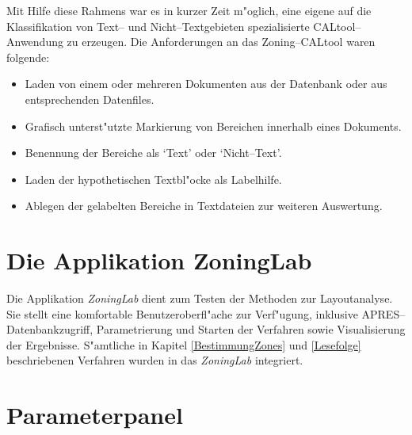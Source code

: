 Mit Hilfe diese Rahmens war es in kurzer Zeit m"oglich, eine eigene
auf die Klassifikation von Text-- und
Nicht--Textgebieten spezialisierte CALtool--Anwendung zu erzeugen. Die Anforderungen an das
Zoning--CALtool waren folgende:
\begin{itemize}
  \item Laden von einem oder mehreren Dokumenten aus der Datenbank oder aus entsprechenden 
  Datenfiles.
  \item Grafisch unterst"utzte Markierung von Bereichen innerhalb eines Dokuments.
  \item Benennung der Bereiche als `Text' oder `Nicht--Text'.
  \item Laden der hypothetischen Textbl"ocke als Labelhilfe.
  \item Ablegen der gelabelten Bereiche in Textdateien zur weiteren Auswertung.
\end{itemize}


\clearpage
\section{Die Applikation ZoningLab}
Die Applikation {\em ZoningLab\/} dient zum Testen der Methoden zur Layoutanalyse. Sie stellt
eine komfortable Benutzeroberfl"ache zur Verf"ugung, inklusive APRES--Datenbankzugriff, 
Parametrierung und Starten der Verfahren sowie Visualisierung der Ergebnisse. S"amtliche in
Kapitel \ref{BestimmungZones} und \ref{Lesefolge} beschriebenen Verfahren wurden in das
{\em ZoningLab\/} integriert.

\clearpage
\section{Parameterpanel}\label{ParameterPanel}

